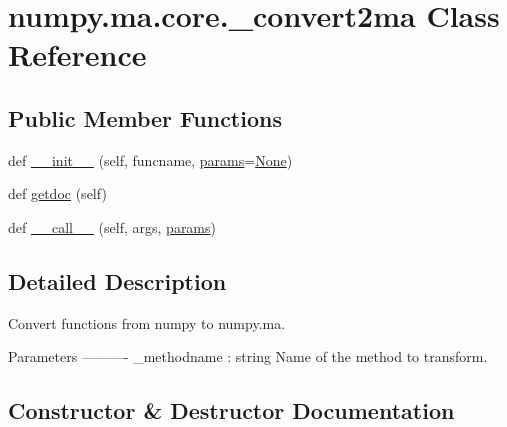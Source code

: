 \hypertarget{classnumpy_1_1ma_1_1core_1_1__convert2ma}{}\section{numpy.\+ma.\+core.\+\_\+convert2ma Class Reference}
\label{classnumpy_1_1ma_1_1core_1_1__convert2ma}
\subsection*{Public Member Functions}
\begin{DoxyCompactItemize}
\item 
def \hyperlink{classnumpy_1_1ma_1_1core_1_1__convert2ma_aae945c48c3932708cafc4701cd27954a}{\+\_\+\+\_\+init\+\_\+\+\_\+} (self, funcname, \hyperlink{namespacenumpy_1_1ma_1_1core_af2219f7433d2b3f0adc0670dc93c9fd1}{params}=\hyperlink{namespacenumpy_1_1ma_1_1core_a647ee1848dfa3692fe35a663a2aa40b3}{None})
\item 
def \hyperlink{classnumpy_1_1ma_1_1core_1_1__convert2ma_a6b1c1592ccd65f6fe1ac2a9c8409fea0}{getdoc} (self)
\item 
def \hyperlink{classnumpy_1_1ma_1_1core_1_1__convert2ma_a8014ec006e1596e593ac5ca51e51564b}{\+\_\+\+\_\+call\+\_\+\+\_\+} (self, args, \hyperlink{namespacenumpy_1_1ma_1_1core_af2219f7433d2b3f0adc0670dc93c9fd1}{params})
\end{DoxyCompactItemize}


\subsection{Detailed Description}
\begin{DoxyVerb}Convert functions from numpy to numpy.ma.

Parameters
----------
    _methodname : string
        Name of the method to transform.\end{DoxyVerb}
 

\subsection{Constructor \& Destructor Documentation}
\mbox{\label{classnumpy_1_1ma_1_1core_1_1__convert2ma_aae945c48c3932708cafc4701cd27954a}} 
